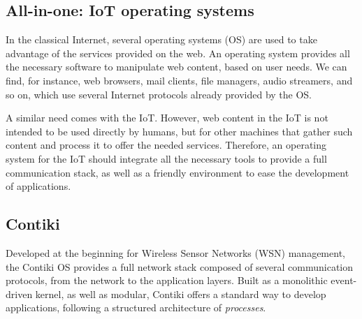 
\subsection{All-in-one: IoT operating systems}
\label{subsec:IoTOS}
In the classical Internet, several operating systems (OS) are used to take advantage of the services provided on the web.
An operating system provides all the necessary software to manipulate web content, based on user needs.
We can find, for instance, web browsers, mail clients, file managers, audio streamers, and so on, which use several Internet protocols already provided by the OS.

A similar need comes with the IoT.
However, web content in the IoT is not intended to be used directly by humans, but for other machines that gather such content and process it to offer the needed services.
Therefore, an operating system for the IoT should integrate all the necessary tools to provide a full communication stack, as well as a friendly environment to ease the development of applications.

\subsection{Contiki}
\label{subsec:contiki}
Developed at the beginning for Wireless Sensor Networks (WSN) management, the Contiki OS\cite{dunkels2004contiki} provides a full network stack composed of several communication protocols, from the network to the application layers.
Built as a monolithic event-driven kernel, as well as modular, Contiki offers a standard way to develop applications, following a structured architecture of \textit{processes}.

